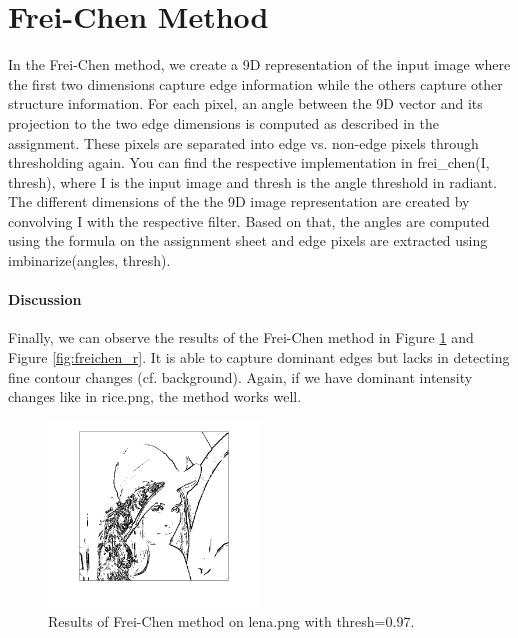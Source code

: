 \documentclass{article}
\begin{document}
\section{Frei-Chen Method}
In the Frei-Chen method, we create a 9D representation of the input image where the first two dimensions capture edge information while the others capture other structure information. For each pixel, an angle between the 9D vector and its projection to the two edge dimensions is computed as described in the assignment. These pixels are separated into edge vs. non-edge pixels through thresholding again. You can find the respective implementation in \textsf{frei\_chen(I, thresh)}, where \textsf{I} is the input image and \textsf{thresh} is the angle threshold in radiant. The different dimensions of the the 9D image representation are created by convolving \textsf{I} with the respective filter. Based on that, the angles are computed using the formula on the assignment sheet and edge pixels are extracted using \textsf{imbinarize(angles, thresh)}.

\paragraph{Discussion}
Finally, we can observe the results of the Frei-Chen method in Figure \ref{fig:freichen} and Figure \ref{fig:freichen_r}. It is able to capture dominant edges but lacks in detecting fine contour changes (cf. background). Again, if we have dominant intensity changes like in \textsf{rice.png}, the method works well.
\begin{figure}
    \centering
    \includegraphics[width=0.5\textwidth]{Images/lena_frei_chen.png}
    \caption{Results of Frei-Chen method on \textsf{lena.png} with thresh=0.97.}
    \label{fig:freichen}
\end{figure}
\end{document}
